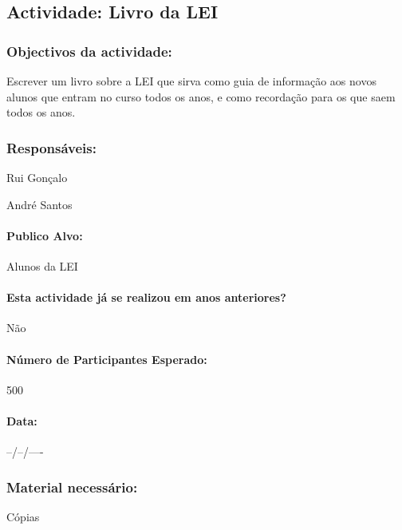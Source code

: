\subsection{Actividade: Livro da LEI} %

\subsubsection*{Objectivos da actividade:}
Escrever um livro sobre a LEI que sirva como guia de informação aos novos alunos que entram no curso todos os anos, e como recordação para os que saem todos os anos.

\subsubsection*{Responsáveis:}
\begin{itemizedash}
	\item{Rui Gonçalo}
	\item{André Santos}
\end{itemizedash}

\paragraph{Publico Alvo: }
Alunos da LEI
\paragraph{Esta actividade já se realizou em anos anteriores?}
Não

\paragraph{Número de Participantes Esperado:}
500

\paragraph{Data:} --/--/----

\subsubsection*{Material necessário:}
\begin{itemizedash}
	\item{Cópias}
\end{itemizedash}

